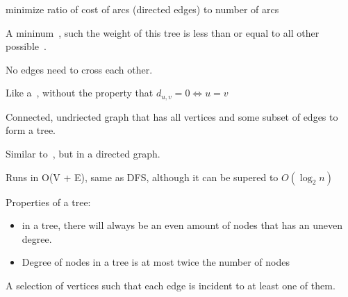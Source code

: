 \begin{definition}
    minimize ratio of cost of arcs (directed edges) to number of arcs
\end{definition}

\begin{definition}[MST]
    A mininum~, such the weight of this tree is less than
    or equal to all other possible~.
\end{definition}

\begin{definition}
    No edges need to cross each other.
\end{definition}

\begin{definition}\label{semimetric}
    Like a~, without the property that
    $d_{u,v} = 0 \iff u = v$
\end{definition}


\begin{definition}\label{spantree}
    Connected, undriected graph that has all vertices and some subset
    of edges to form a tree.
\end{definition}

\begin{definition}
    Similar to~, but in a directed graph.
\end{definition}

\begin{definition}\label{topsort}
    Runs in O(V + E), same as DFS, although it can be supered to $O(\log_{2} n)$
\end{definition}

\begin{definition}[Tree]\label{tree}
    Properties of a tree:
    \begin{itemize}
        \item in a tree, there will always be an even amount of nodes that has
            an uneven degree.
        \item Degree of nodes in a tree is at most twice the number of nodes
    \end{itemize}
\end{definition}



\begin{definition}
    A selection of vertices such that each edge is incident to at least one
    of them.
\end{definition}

